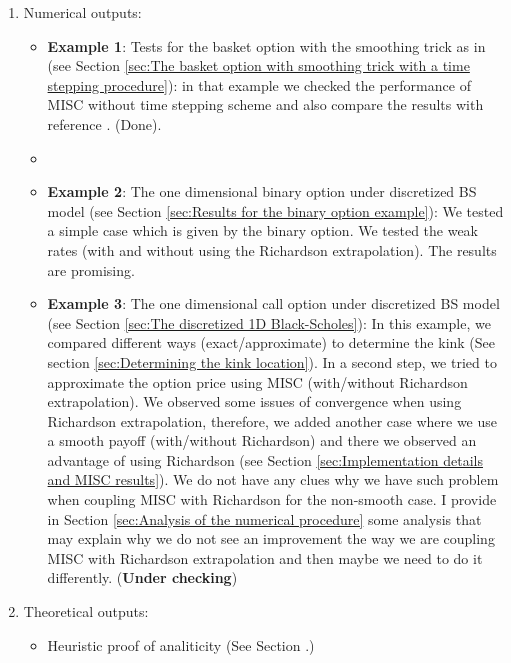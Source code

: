 \documentclass[11pt]{article}
\begin{document}
\begin{enumerate}
	\item Numerical outputs:
	\begin{itemize}
	
	 \item \textbf{Example 1}: Tests for  the basket option with the smoothing trick as in \cite{bayersmoothing} (see Section \ref{sec:The basket option with smoothing trick with a time stepping procedure}): in that example we  checked the performance of MISC without time stepping scheme and also compare the results with reference \cite{bayersmoothing}. (Done).
	
	
	
		\item 	\item  \textbf{Example 2}: The one dimensional binary option under discretized BS model (see Section \ref{sec:Results for the binary option example}):  We tested a simple case which is given by the binary option. We tested the weak rates (with and without using the Richardson extrapolation). The results are  promising.
		
		\item \textbf{Example 3}: The one dimensional call option under discretized BS model (see Section \ref{sec:The discretized 1D Black-Scholes}): In this example, we compared different ways (exact/approximate) to determine the kink (See section \ref{sec:Determining the kink location}). In a second step, we tried to approximate the option price using MISC (with/without Richardson extrapolation). We observed some issues of convergence when using Richardson extrapolation, therefore, we added another case where we use a smooth payoff (with/without Richardson) and there we observed an advantage of using Richardson (see Section \ref{sec:Implementation details and  MISC results}). We do not have any clues why we have such problem when coupling MISC with Richardson for the non-smooth case.  I provide in Section \ref{sec:Analysis of the numerical procedure} some analysis that may explain why we do not see an improvement the way we are coupling MISC with Richardson extrapolation and then maybe we need to do it differently. (\textbf{Under checking})
		\end{itemize}
	\item  Theoretical outputs:
	\begin{itemize}
		\item Heuristic proof of analiticity (See Section .)
	\end{itemize}
\end{enumerate}
\end{document}
